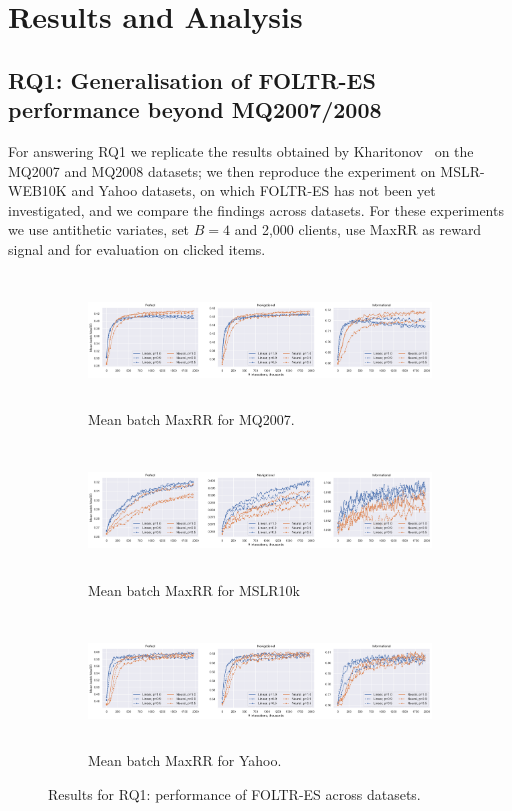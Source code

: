 \section{Results and Analysis}


\subsection{RQ1: Generalisation of FOLTR-ES performance beyond MQ2007/2008}
For answering RQ1 we replicate the results obtained by Kharitonov~\cite{kharitonov2019federated} on the MQ2007 and MQ2008 datasets; we then reproduce the experiment on MSLR-WEB10K and Yahoo datasets, on which FOLTR-ES has not been yet investigated, and we compare the findings across datasets. For these experiments we use antithetic variates, set $B = 4$ and 2,000 clients, use MaxRR as reward signal and for evaluation on clicked items. 

\begin{figure}[t]
	\centering
	\begin{subfigure}{1\textwidth}
		\includegraphics[width=15cm, height=3.5cm]{images/RQ1/mq2007_foltr_c2000_ps.png}
		\caption{Mean batch MaxRR for MQ2007.}
		\label{fig:mq2007-rq1}
	\end{subfigure}
	\begin{subfigure}{1\textwidth}
		\includegraphics[width=15cm, height=3.5cm]{images/RQ1/mslr10k_foltr_c2000_ps.png}
		\caption{Mean batch MaxRR for MSLR10k}
		\label{fig:mslr10k-rq1}
	\end{subfigure}
	\begin{subfigure}{1\textwidth}
		\includegraphics[width=15cm, height=3.5cm]{images/RQ1/yahoo_foltr_c2000_ps.png}
		\caption{Mean batch MaxRR for Yahoo.}
		\label{fig:yahoo-rq1}
	\end{subfigure}
	\caption{Results for RQ1: performance of FOLTR-ES across datasets.}
\end{figure}

